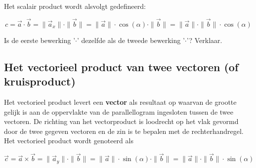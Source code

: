 \documentclass{ximera}
\begin{document}
Het scalair product wordt alsvolgt gedefineerd: 

$$
c = \vec{a} \cdot \vec{b} = \| \vec{a}_x \| \cdot \|\vec{b}\| = \|\vec{a}\| \cdot \cos(\alpha) \cdot \|\vec{b}\| = \| \vec{a}\| \cdot \| \vec{b}\| \cdot \cos(\alpha)
$$

\begin{quickquestion*}{}{}
    Is de eerste bewerking '\(\cdot\)' dezelfde als de tweede bewerking '\(\cdot\)'? Verklaar. 
\end{quickquestion*}

\begin{image}[!]
\end{image}

\subsection*{Het vectorieel product van twee vectoren (of kruisproduct)}

Het vectorieel product levert een \textbf{vector} als resultaat op waarvan de grootte gelijk is aan de oppervlakte van de parallellogram ingesloten tussen de twee vectoren. 
De richting van het vectorproduct is loodrecht op het vlak gevormd door de twee gegeven vectoren en de zin is te bepalen met de rechterhandregel.
Het vectorieel product wordt genoteerd als 

\[
\vec{c} = \vec{a} \times \vec{b} = \| \vec{a}_y \| \cdot \|\vec{b}\| = \|\vec{a}\| \cdot \sin(\alpha) \cdot \|\vec{b}\| = \| \vec{a}\| \cdot \| \vec{b}\| \cdot \sin(\alpha)
\]
\end{document}
